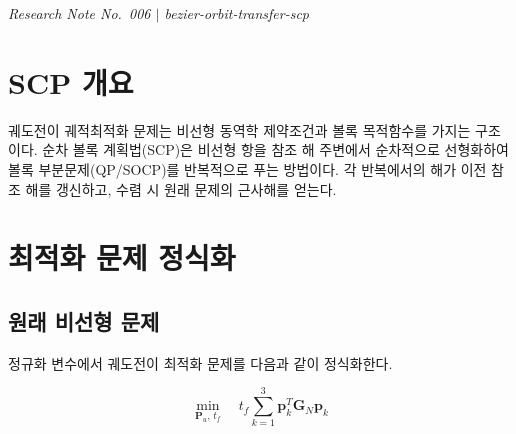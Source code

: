 \documentclass[11pt]{article}
\begin{document}
\drawborder
\thispagestyle{firstpage}


{\normalsize\textit{Research Note No.~006 $|$ bezier-orbit-transfer-scp}}\par\medskip

\def\lighterdate{March 12, 2026}


\begin{abstract}
본 보고서는 베지어 곡선 기반 궤도전이 궤적최적화를 위한
순차 볼록 계획법(Sequential Convex Programming, SCP) 알고리즘을 정식화한다.
비선형 동역학 제약조건을 참조 궤도 주변에서 선형화하고,
\cite{report004}의 적분 행렬과 \cite{report005}의 제약조건 처리를 결합하여
매 반복마다 QP 또는 SOCP를 풀어 수렴하는 구조를 제시한다.
수렴 조건 및 알고리즘 흐름도를 함께 정리한다.
\end{abstract}

\section{SCP 개요}

궤도전이 궤적최적화 문제는 비선형 동역학 제약조건과
볼록 목적함수를 가지는 구조이다.
순차 볼록 계획법(SCP)은 비선형 항을 참조 해 주변에서 순차적으로 선형화하여
볼록 부분문제(QP/SOCP)를 반복적으로 푸는 방법이다.
각 반복에서의 해가 이전 참조 해를 갱신하고, 수렴 시 원래 문제의 근사해를 얻는다.

\section{최적화 문제 정식화}

\subsection{원래 비선형 문제}

정규화 변수에서 궤도전이 최적화 문제를 다음과 같이 정식화한다.

\begin{equation}
  \min_{\mathbf{P}_u,\, t_f}\quad
  t_f \sum_{k=1}^{3} \mathbf{p}_k^T \mathbf{G}_N \mathbf{p}_k
  \label{eq:nlp}
\end{equation}
\end{document}
